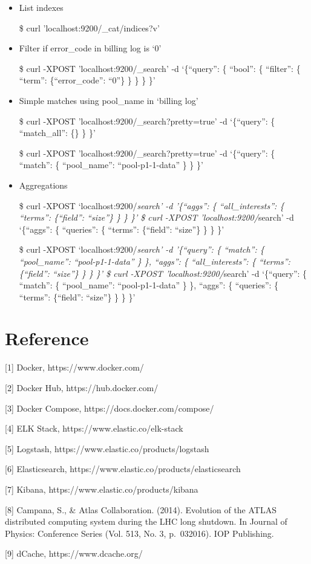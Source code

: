\documentclass[]{article}
\begin{document}
\begin{itemize}
\item
  List indexes

  \$ curl 'localhost:9200/\_cat/indices?v'
\item
  Filter if error\_code in billing log is `0'

  \$ curl -XPOST 'localhost:9200/\_search' -d `\{``query'': \{ ``bool'':
  \{ ``filter'': \{ ``term'': \{``error\_code'': ``0''\} \} \} \} \}'
\item
  Simple matches using pool\_name in `billing log'

  \$ curl -XPOST 'localhost:9200/\_search?pretty=true' -d `\{``query'':
  \{ ``match\_all'': \{\} \} \}'

  \$ curl -XPOST 'localhost:9200/\_search?pretty=true' -d `\{``query'':
  \{ ``match'': \{ ``pool\_name'': ``pool-p1-1-data'' \} \} \}'
\item
  Aggregations

  \$ curl -XPOST `localhost:9200/\emph{search' -d '\{``aggs'': \{
  ``all\_interests'': \{ ``terms'': \{``field'': ``size''\} \} \} \}' \$
  curl -XPOST 'localhost:9200/}search' -d `\{``aggs'': \{ ``queries'':
  \{ ``terms'': \{``field'': ``size''\} \} \} \}'

  \$ curl -XPOST `localhost:9200/\emph{search' -d '\{``query'': \{
  ``match'': \{ ``pool\_name'': ``pool-p1-1-data'' \} \}, ``aggs'': \{
  ``all\_interests'': \{ ``terms'': \{``field'': ``size''\} \} \} \}' \$
  curl -XPOST 'localhost:9200/}search' -d `\{``query'': \{ ``match'': \{
  ``pool\_name'': ``pool-p1-1-data'' \} \}, ``aggs'': \{ ``queries'': \{
  ``terms'': \{``field'': ``size''\} \} \} \}'
\end{itemize}

\section{Reference}\label{reference}

{[}1{]} Docker, https://www.docker.com/

{[}2{]} Docker Hub, https://hub.docker.com/

{[}3{]} Docker Compose, https://docs.docker.com/compose/

{[}4{]} ELK Stack, https://www.elastic.co/elk-stack

{[}5{]} Logstash, https://www.elastic.co/products/logstash

{[}6{]} Elasticsearch, https://www.elastic.co/products/elasticsearch

{[}7{]} Kibana, https://www.elastic.co/products/kibana

{[}8{]} Campana, S., \& Atlas Collaboration. (2014). Evolution of the
ATLAS distributed computing system during the LHC long shutdown. In
Journal of Physics: Conference Series (Vol. 513, No. 3, p.~032016). IOP
Publishing.

{[}9{]} dCache, https://www.dcache.org/
\end{document}
